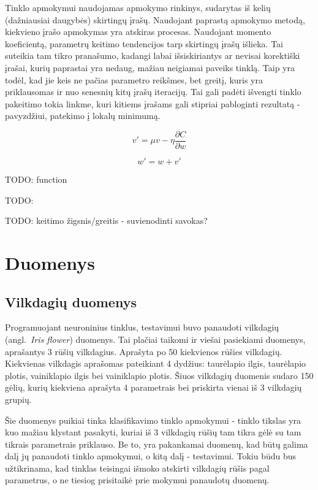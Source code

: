 \documentclass{VUMIFPSbakalaurinis}
\newcommand{\TODO}[1]{
\colorbox{todo-background-color}{TODO: #1}
}
\begin{document}
Tinklo apmokymui naudojamas apmokymo rinkinys, sudarytas iš kelių (dažniausiai daugybės) skirtingų įrašų.
Naudojant paprastą apmokymo metodą, kiekvieno įrašo apmokymas yra atskiras procesas.
Naudojant momento koeficientą, parametrų keitimo tendencijos tarp skirtingų įrašų išlieka.
Tai suteikia tam tikro pranašumo, kadangi labai išsiskiriantys ar nevisai korektiški įrašai, kurių paprastai yra nedaug, mažiau neigiamai paveiks tinklą.
Taip yra todėl, kad jie keis ne pačias parametro reikšmes, bet greitį, kuris yra priklausomas ir nuo senesnių kitų įrašų iteracijų.
Tai gali padėti išvengti tinklo pakeitimo tokia linkme, kuri kitiems įrašams gali stipriai pabloginti rezultatą - pavyzdžiui, patekimo į lokalų minimumą.

\begin{equation} \label{eq:moment-1}
v' = \mu v - \eta \frac{\partial C}{\partial w}
\end{equation}

\begin{equation} \label{eq:moment-2}
w' = w + v'
\end{equation}


\TODO{function}

\TODO{}

\TODO{keitimo žigsnis/greitis - suvienodinti savokas?}


\section{Duomenys}


\subsection{Vilkdagių duomenys}

Programuojant neuroninius tinklus, testavimui buvo panaudoti vilkdagių (angl.~\textit{Iris flower}) duomenys.
Tai plačiai taikomi ir viešai pasiekiami duomenys, aprašantys 3 rūšių vilkdagius.
Aprašyta po 50 kiekvienos rūšies vilkdagių.
Kiekvienas vilkdagis aprašomas pateikiant 4 dydžius: taurėlapio ilgis, taurėlapio plotis, vainiklapio ilgis bei vainiklapio plotis.
Šiuos vilkdagių duomenis sudaro 150 gėlių, kurių kiekviena aprašyta 4 parametrais bei priskirta vienai iš 3 vilkdagių grupių.

Šie duomenys puikiai tinka klasifikavimo tinklo apmokymui - tinklo tikslas yra kuo mažiau klystant pasakyti, kuriai iš 3 vilkdagių rūšių tam tikra gėlė su tam tikrais parametrais priklauso.
Be to, yra pakankamai duomenų, kad būtų galima dalį jų panaudoti tinklo apmokymui, o kitą dalį - testavimui.
Tokiu būdu bus užtikrinama, kad tinklas teisingai išmoko atskirti vilkdagių rūšis pagal parametrus, o ne tiesiog prisitaikė prie mokymui panaudotų duomenų.
\end{document}
